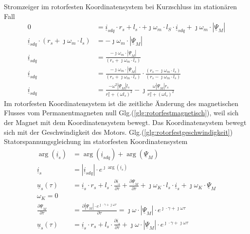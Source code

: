 \documentclass[12pt]{article} %
\numberwithin{equation}{subsection}
\begin{document}
	Stromzeiger im rotorfesten Koordinatensystem bei Kurzschluss im stationären Fall
	\begin{align}
		0 &= \underline{i}_{sdq} \cdot r_s + l_s \cdot + \jmath \omega_m \cdot l_S \cdot \underline{i}_{sdq} + \jmath \omega_m \cdot |\underline{\Psi}_M|\\
		\underline{i}_{sdq} \cdot (r_s + \jmath \omega_m \cdot l_s) & =  - \jmath \omega_m \cdot |\underline{\Psi}_M|\\
		\underline{i}_{sdq}  & =  \frac{- \jmath \omega_m \cdot |\underline{\Psi}_M|}{(r_s + \jmath \omega_m \cdot l_s)}\\
		\underline{i}_{sdq}  & =  \frac{- \jmath \omega_m \cdot |\underline{\Psi}_{M}|}{(r_s + \jmath \omega_m \cdot l_s)} \cdot \frac{(r_s - \jmath \omega_m \cdot l_s)}{(r_s - \jmath \omega_m \cdot l_s)}\\
		\underline{i}_{sdq}  & = \frac{-\omega^2 |\underline{\Psi}_M| l_s}{r_s^2 + (\omega l_s)^2} -\jmath \frac{\omega |\underline{\Psi}_M| r_s}{r_s^2 + (\omega l_s)^2}\label{glg:stromzeiger rotorfest ks}
	\end{align}
	Im rotorfesten Koordinatensystem ist die zeitliche Änderung des magnetischen Flusses vom Permanentmagneten null Glg.(\ref{glg:rotorfestmagnetisch}), weil  sich der Magnet mit dem Koordinatensystem bewegt. Das Koordinatensystem bewegt sich mit der Geschwindigkeit des Motors. Glg.(\ref{glg:rotorfestgeschwindigkeit})\\ 
	Statorspannungsgleichung im statorfesten Koordinatensystem
	\begin{align}
		\arg(\underline{i}_s) &= \arg(\underline{i}_{sdq}) + \arg(\underline{\Psi}_M)\\
		\underline{i}_s &= |\underline{i}_{sdq}| \cdot e^{\jmath \arg(\underline{i}_{s})}\\
		\underline{u}_s(\tau) &= \underline{i}_s \cdot r_s + l_s \cdot \frac{\partial \underline{i}_s}{\partial \tau} + \frac{\partial \underline{\Psi}_M}{\partial \tau} + \jmath \omega_K \cdot l_s \cdot \underline{i}_s + \jmath \omega_K \cdot \underline{\Psi}_M \\
		\omega_K=0 \label{glg:statorfest} \\
		\frac{\partial \underline{\Psi}_M}{\partial \tau} &= \frac{\partial |\underline{\Psi}_M | \cdot e^{\jmath \cdot \gamma + \jmath \omega \tau}}{\partial \tau} = \jmath\omega \cdot|\underline{\Psi}_M | \cdot e^{\jmath \cdot \gamma + \jmath \omega \tau}\\
		\underline{u}_s(\tau) &= \underline{i}_s \cdot r_s + l_s \cdot \frac{\partial \underline{i}_s}{\partial \tau} + \jmath\omega \cdot|\underline{\Psi}_M | \cdot e^{\jmath \cdot \gamma + \jmath \omega \tau} \label{glg:spannungraumzeiger rotor}
	\end{align}
\end{document}
